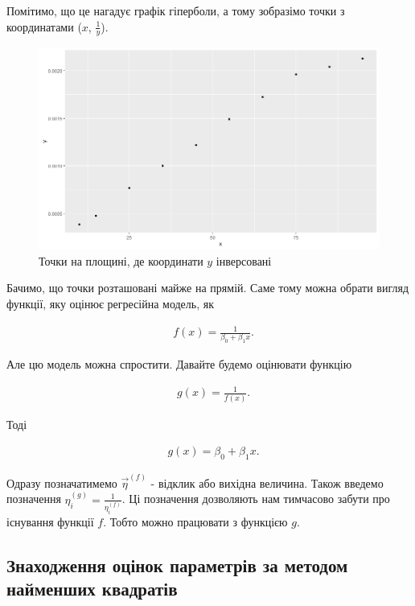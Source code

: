 \documentclass[14pt,a4paper]{scrartcl}
\theoremstyle{definition}
\theoremstyle{remark}
\theoremstyle{definition}
\theoremstyle{definition}
\begin{document}
Помітимо, що це нагадує графік гіперболи, а тому зобразімо точки з координатами ($x$, $\frac{1}{y}$).

\begin{figure}[H]
  \includegraphics[width=\linewidth]{Inv_Plot.png}
  \caption{Точки на площині, де координати $y$ інверсовані}
  \label{fig:image2}
\end{figure}

Бачимо, що точки розташовані майже на прямій. Саме тому можна обрати вигляд функції, яку оцінює регресійна модель, як

\begin{align*}
  & f(x) = \frac{1}{\beta_{0} + \beta_{1} x}.
\end{align*}

Але цю модель можна спростити. Давайте будемо оцінювати функцію

\begin{align*}
  & g(x) = \frac{1}{f(x)}.
\end{align*}

Тоді

\begin{align*}
  & g(x) = \beta_{0} + \beta_{1} x.
\end{align*}

Одразу позначатимемо $\vec{\eta}^{(f)}$ - відклик або вихідна величина. Також введемо позначення $\eta_{i}^{(g)} = \frac{1}{\eta_{i}^{(f)}}$. Ці позначення дозволяють нам тимчасово забути про існування функції $f$. Тобто можно працювати з функцією $g$.

\subsection{Знаходження оцінок параметрів за методом найменших квадратів}
\end{document}
